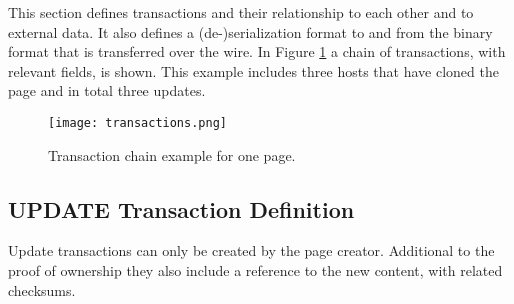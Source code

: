 
This section defines transactions and their relationship to each other and to
external data. It also defines a (de-)serialization format to and
from the binary format that is transferred over the wire. In Figure
\ref{fig:transactions} a chain of transactions, with relevant fields, is
shown. This example includes three hosts that have cloned the page and in total
three updates.

\begin{figure}[htp]
\texttt{[image: transactions.png]}
\label{fig:transactions}
\caption{Transaction chain example for one page.}
\end{figure}

\subsection{UPDATE Transaction Definition}

Update transactions can only be created by the page creator. Additional to the
proof of ownership they also include a reference to the new content, with
related checksums.

